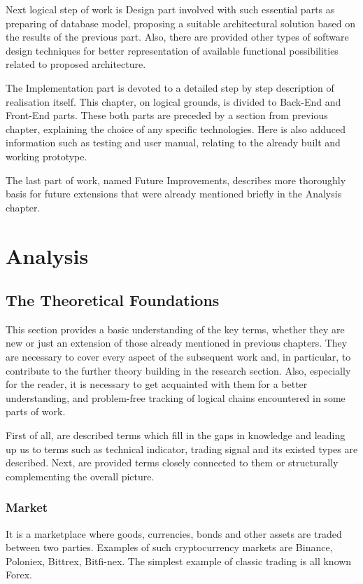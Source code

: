 \documentclass[thesis=B,english]{FITthesis}[2019/03/06]
\begin{document}
Next logical step of work is Design part involved with such essential parts as preparing of database model, proposing a suitable architectural solution based on the results of the previous part. Also, there are provided other types of software design techniques for better representation of available functional possibilities related to proposed architecture. 

The Implementation part is devoted to a detailed step by step description of realisation itself. This chapter, on logical grounds, is divided to Back-End and Front-End parts. These both parts are preceded by a section from previous chapter, explaining the choice of any specific technologies. Here is also adduced information such as testing and user manual, relating to the already built and working prototype.

The last part of work, named Future Improvements, describes more thoroughly basis for future extensions that were already mentioned briefly in the Analysis chapter.

\chapter{Analysis}
\section{The Theoretical Foundations}
This section provides a basic understanding of the key terms, whether they are new or just an extension of those already mentioned in previous chapters. They are necessary to cover every aspect of the subsequent work and, in particular, to contribute to the further theory building in the research section. Also, especially for the reader, it is necessary to get acquainted with them for a better understanding, and problem-free tracking of logical chains encountered in some parts of work.

First of all, are described terms which fill in the gaps in knowledge and leading up us to terms such as technical indicator, trading signal and its existed types are described. Next, are provided terms closely connected to them or structurally complementing the overall picture.

\subsection{Market}
It is a marketplace where goods, currencies, bonds and other assets are traded between two parties. Examples of such cryptocurrency markets are Binance, Poloniex, Bittrex, Bitfi-nex. The simplest example of classic trading is all known Forex.
\end{document}
